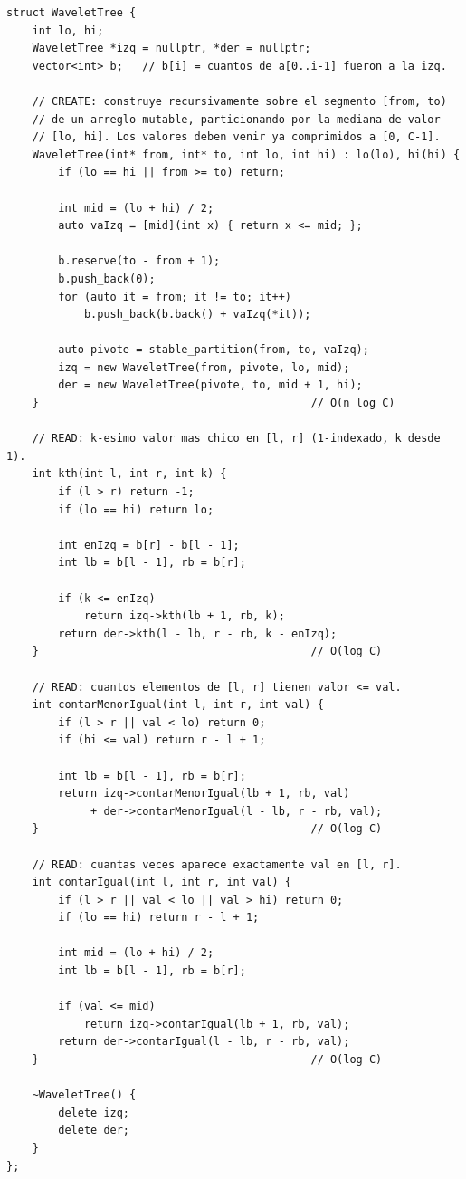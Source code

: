 \documentclass[10pt,a4paper,twocolumn]{article}
\begin{document}
\begin{lstlisting}[style=cpp]
struct WaveletTree {
    int lo, hi;
    WaveletTree *izq = nullptr, *der = nullptr;
    vector<int> b;   // b[i] = cuantos de a[0..i-1] fueron a la izq.

    // CREATE: construye recursivamente sobre el segmento [from, to)
    // de un arreglo mutable, particionando por la mediana de valor
    // [lo, hi]. Los valores deben venir ya comprimidos a [0, C-1].
    WaveletTree(int* from, int* to, int lo, int hi) : lo(lo), hi(hi) {
        if (lo == hi || from >= to) return;

        int mid = (lo + hi) / 2;
        auto vaIzq = [mid](int x) { return x <= mid; };

        b.reserve(to - from + 1);
        b.push_back(0);
        for (auto it = from; it != to; it++)
            b.push_back(b.back() + vaIzq(*it));

        auto pivote = stable_partition(from, to, vaIzq);
        izq = new WaveletTree(from, pivote, lo, mid);
        der = new WaveletTree(pivote, to, mid + 1, hi);
    }                                          // O(n log C)

    // READ: k-esimo valor mas chico en [l, r] (1-indexado, k desde 1).
    int kth(int l, int r, int k) {
        if (l > r) return -1;
        if (lo == hi) return lo;

        int enIzq = b[r] - b[l - 1];
        int lb = b[l - 1], rb = b[r];

        if (k <= enIzq)
            return izq->kth(lb + 1, rb, k);
        return der->kth(l - lb, r - rb, k - enIzq);
    }                                          // O(log C)

    // READ: cuantos elementos de [l, r] tienen valor <= val.
    int contarMenorIgual(int l, int r, int val) {
        if (l > r || val < lo) return 0;
        if (hi <= val) return r - l + 1;

        int lb = b[l - 1], rb = b[r];
        return izq->contarMenorIgual(lb + 1, rb, val)
             + der->contarMenorIgual(l - lb, r - rb, val);
    }                                          // O(log C)

    // READ: cuantas veces aparece exactamente val en [l, r].
    int contarIgual(int l, int r, int val) {
        if (l > r || val < lo || val > hi) return 0;
        if (lo == hi) return r - l + 1;

        int mid = (lo + hi) / 2;
        int lb = b[l - 1], rb = b[r];

        if (val <= mid)
            return izq->contarIgual(lb + 1, rb, val);
        return der->contarIgual(l - lb, r - rb, val);
    }                                          // O(log C)

    ~WaveletTree() {
        delete izq;
        delete der;
    }
};
\end{lstlisting}
\end{document}

